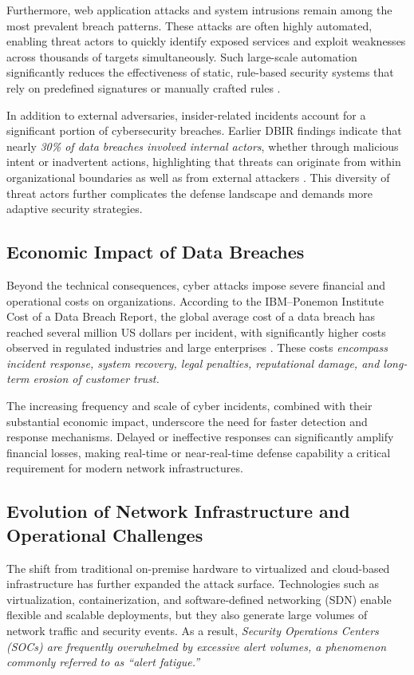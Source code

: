 \documentclass[12pt,a4paper]{report}
\begin{document}
Furthermore, web application attacks and system intrusions remain among the most prevalent breach patterns. These attacks are often highly automated, enabling threat actors to quickly identify exposed services and exploit weaknesses across thousands of targets simultaneously. Such large-scale automation significantly reduces the effectiveness of static, rule-based security systems that rely on predefined signatures or manually crafted rules \cite{verizonDBIR2024}.

In addition to external adversaries, insider-related incidents account for a significant portion of cybersecurity breaches. Earlier DBIR findings indicate that nearly \textit{30\% of data breaches involved internal actors}, whether through malicious intent or inadvertent actions, highlighting that threats can originate from within organizational boundaries as well as from external attackers \cite{verizonDBIR2020}. This diversity of threat actors further complicates the defense landscape and demands more adaptive security strategies.

\subsection{Economic Impact of Data Breaches}

Beyond the technical consequences, cyber attacks impose severe financial and operational costs on organizations. According to the IBM--Ponemon Institute Cost of a Data Breach Report, the global average cost of a data breach has reached several million US dollars per incident, with significantly higher costs observed in regulated industries and large enterprises \cite{ibmPonemon2024}. These costs \textit{encompass incident response, system recovery, legal penalties, reputational damage, and long-term erosion of customer trust.}

The increasing frequency and scale of cyber incidents, combined with their substantial economic impact, underscore the need for faster detection and response mechanisms. Delayed or ineffective responses can significantly amplify financial losses, making real-time or near-real-time defense capability a critical requirement for modern network infrastructures.

\subsection{Evolution of Network Infrastructure and Operational Challenges}

The shift from traditional on-premise hardware to virtualized and cloud-based infrastructure has further expanded the attack surface. Technologies such as virtualization, containerization, and software-defined networking (SDN) enable flexible and scalable deployments, but they also generate large volumes of network traffic and security events. As a result, \textit{Security Operations Centers (SOCs) are frequently overwhelmed by excessive alert volumes, a phenomenon commonly referred to as ``alert fatigue.''} \cite{alertFatigue2022}
\end{document}
